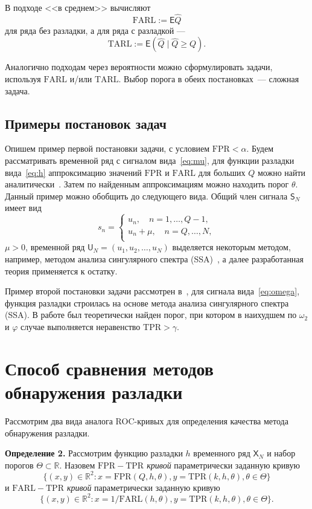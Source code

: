 \documentclass{math-mech-sci}
\newcommand{\X}{\mathsf X}
\renewcommand{\S}{\mathsf S}
\newcommand{\FPR}{\mathrm{FPR}}
\newcommand{\TPR}{\mathrm{TPR}}
\newcommand{\FARL}{\mathrm{FARL}}
\newcommand{\TARL}{\mathrm{TARL}}
\renewcommand{\geq}{\geqslant}
\begin{document}
	В подходе <<в среднем>> вычисляют
	\begin{equation*}
	\FARL:=\mathsf E\widehat Q
	\end{equation*}
	для ряда без разладки, а для ряда с разладкой ---
	\begin{equation*}
		\TARL:=\mathsf E (\widehat Q\mid \widehat Q\geq Q).
	\end{equation*}

Аналогично подходам через вероятности можно сформулировать задачи, используя $\FARL$ и/или $\TARL$. Выбор порога в обеих постановках~--- сложная задача.

\subsection{Примеры постановок задач}
Опишем пример первой постановки задачи, с условием $\FPR<\alpha$. Будем рассматривать временной ряд с сигналом вида~\eqref{eq:mu}, для функции разладки вида~\eqref{eq:h} аппроксимацию значений $\FPR$ и $\FARL$ для больших $Q$ можно найти аналитически~\cite{noonan}. Затем по найденным аппроксимациям можно находить порог $\theta$. Данный пример можно обобщить до следующего вида. Общий член сигнала $\S_N$ имеет вид
\begin{equation*}
	s_n=\begin{cases}
		u_n,\quad n=1,\ldots,Q-1,\\
		u_n+\mu,\quad n=Q,\ldots,N,\\
	\end{cases}
\end{equation*}
	$\mu>0$, временной ряд $\mathsf U_N=(u_1,u_2,\ldots,u_N)$ выделяется некоторым методом, например, методом анализа сингулярного спектра (SSA)~\cite{ssa}, а далее разработанная теория применяется к остатку.
	
	Пример второй постановки задачи рассмотрен в~\cite{egor}, для сигнала вида~\eqref{eq:omega}, функция разладки строилась на основе метода анализа сингулярного спектра (SSA). В работе был теоретически найден порог, при котором в наихудшем по $\omega_2$ и $\varphi$ случае выполняется неравенство $\TPR>\gamma$.
	
\section{Способ сравнения методов обнаружения разладки}
	Рассмотрим два вида аналога ROC-кривых для определения качества метода обнаружения разладки.

	\textbf{Определение 2.} Рассмотрим функцию разладки $h$ временного ряд $\X_N$ и набор порогов $\Theta\subset\mathbb R$. Назовем \textit{$\FPR-\TPR$ кривой} параметрически заданную кривую $$\{(x,y)\in\mathbb R^2:x=\FPR(Q,h,\theta),y=\TPR(k,h,\theta),\theta\in\Theta\}$$ и \textit{$\FARL-\TPR$ кривой} параметрически заданную кривую $$\{(x,y)\in\mathbb R^2:x=1/\FARL(h,\theta),y=\TPR(k,h,\theta),\theta\in\Theta\}.$$
\end{document}
